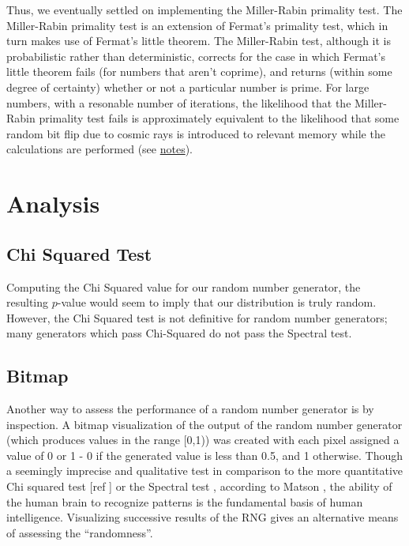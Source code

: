 \documentclass{article}
\begin{document}
Thus, we eventually settled on implementing the Miller-Rabin primality test. The Miller-Rabin primality test is an extension of Fermat's primality test, which in turn makes use of Fermat's little theorem. The Miller-Rabin test, although it is probabilistic rather than deterministic, corrects for the case in which Fermat's little theorem fails (for numbers that aren't coprime), and returns (within some degree of certainty) whether or not a particular number is prime. For large numbers, with a resonable number of iterations, the likelihood that the Miller-Rabin primality test fails is approximately equivalent to the likelihood that some random bit flip due to cosmic rays is introduced to relevant memory while the calculations are performed (see \hyperref[sec:rays]{notes}).




\section{Analysis}
\subsection{Chi Squared Test}
\label{chi}
Computing the Chi Squared value for our random number generator, the resulting $p$-value would seem to imply that our distribution is truly random. However, the Chi Squared test is not definitive for random number generators; many generators which pass Chi-Squared do not pass the Spectral test.

\subsection{Bitmap}
Another way to assess the performance of a random number generator is by inspection. A bitmap visualization of the output of the random number generator (which produces values in the range [0,1)) was created with each pixel assigned a value of 0 or 1 - 0 if the generated value is less than 0.5, and 1 otherwise. Though a seemingly imprecise and qualitative test in comparison to the more quantitative Chi squared test [ref ] or the Spectral test \cite{spectral}, according to Matson \cite{matson}, the ability of the human brain to recognize patterns is the fundamental basis of human intelligence. Visualizing successive results of the RNG gives an alternative means of assessing the ``randomness''.
\end{document}
